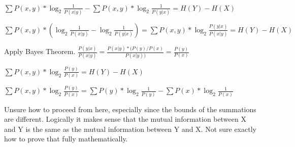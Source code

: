 \documentclass[12pt]{article}
\begin{document}
$   \sum  P(x,y) * \log_2{\frac{1}{P(x|y)}} -  \sum  P(x,y) * \log_2{\frac{1}{P(y|x)}}  = H(Y) - H(X) $

$  \sum  P(x,y) * ( \log_2{\frac{1}{P(x|y)}}  -  \log_2{\frac{1}{P(y|x)}} ) =  \sum  P(x,y) *  \log_2{\frac{P(y|x)}{P(x|y)}}  = H(Y) - H(X)  $

Apply Bayes Theorem.
$\frac{P(y|x)}{P(x|y)}  = \frac{P(x|y)*(P(y)/P(x)}{P(x|y))} = \frac{P(y)}{P(x)} $

$ \sum  P(x,y) *  \log_2{\frac{P(y)}{P(x)}} = H(Y) - H(X) $

$   \sum  P(x,y) *  \log_2{\frac{P(y)}{P(x)}}  =\sum  P(y) * \log_2{\frac{1}{P(y)}}- \sum  P(x) * \log_2{\frac{1}{P(x)}}$

Unsure how to proceed from here, especially since the bounds of the summations are different. Logically it makes sense that the mutual information between X and Y is the same as the mutual information between Y and X. Not sure exactly how to prove that fully mathematically.
 
\end{document}
